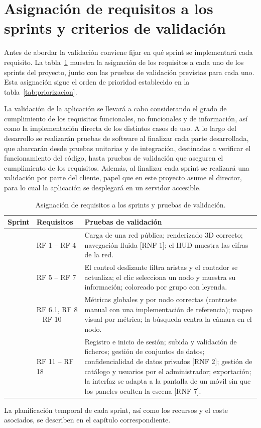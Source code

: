 

\section{Asignación de requisitos a los sprints y criterios de validación}

Antes de abordar la validación conviene fijar en qué sprint se implementará cada requisito. La
tabla~\ref{tab:validacion} muestra la asignación de los requisitos a cada uno de los sprints del
proyecto, junto con las pruebas de validación previstas para cada uno. Esta asignación sigue el orden
de prioridad establecido en la tabla~\ref{tab:priorizacion}.

La validación de la aplicación se llevará a cabo considerando el grado de cumplimiento de los
requisitos funcionales, no funcionales y de información, así como la implementación directa de los
distintos casos de uso. A lo largo del desarrollo se realizarán pruebas de software al finalizar cada
parte desarrollada, que abarcarán desde pruebas unitarias y de integración, destinadas a verificar el
funcionamiento del código, hasta pruebas de validación que aseguren el cumplimiento de los
requisitos. Además, al finalizar cada sprint se realizará una validación por parte del cliente, papel
que en este proyecto asume el director, para lo cual la aplicación se desplegará en un servidor
accesible.

\begin{table}[H]
	\centering
	\caption{Asignación de requisitos a los sprints y pruebas de validación.}
	\label{tab:validacion}
	\begin{tabularx}{\textwidth}{>{\centering\arraybackslash}p{1.4cm} >{\raggedright\arraybackslash}p{3.2cm} >{\raggedright\arraybackslash}X}
		\toprule
		\textbf{Sprint} & \textbf{Requisitos} & \textbf{Pruebas de validación} \\
		\midrule
		1 & RF 1 -- RF 4 &
			Carga de una red pública; renderizado 3D correcto; navegación fluida [RNF 1]; el HUD
			muestra las cifras de la red. \\
		\addlinespace
		2 & RF 5 -- RF 7 &
			El control deslizante filtra aristas y el contador se actualiza; el clic selecciona un
			nodo y muestra su información; coloreado por grupo con leyenda. \\
		\addlinespace
		3 & RF 6.1, RF 8 -- RF 10 &
			Métricas globales y por nodo correctas (contraste manual con una implementación de
			referencia); mapeo visual por métrica; la búsqueda centra la cámara en el nodo. \\
		\addlinespace
		4 & RF 11 -- RF 18 &
			Registro e inicio de sesión; subida y validación de ficheros; gestión de conjuntos de
			datos; confidencialidad de datos privados [RNF 2]; gestión de catálogo y usuarios por el
			administrador; exportación; la interfaz se adapta a la pantalla de un móvil sin que los
			paneles oculten la escena [RNF 7]. \\
		\bottomrule
	\end{tabularx}
\end{table}

La planificación temporal de cada sprint, así como los recursos y el coste asociados, se describen en
el capítulo correspondiente.
